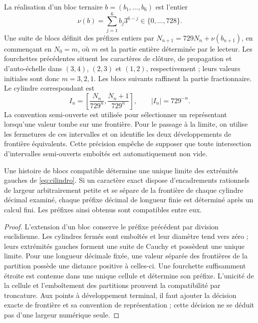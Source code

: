 La réalisation d'un bloc ternaire \(b=(b_1,\ldots,b_6)\) est l'entier
\[
 \nu(b)=\sum_{j=1}^6b_j3^{6-j}\in\{0,\ldots,728\}.
\]
Une suite de blocs définit des préfixes entiers par \(N_{n+1}=729N_n+\nu(b_{n+1})\), en commençant en \(N_0=m\), où \(m\) est la partie entière déterminée par le lecteur. Les fourchettes précédentes situent les caractères de clôture, de propagation et d'auto-échelle dans \((3,4)\), \((2,3)\) et \((1,2)\), respectivement ; leurs valeurs initiales sont donc \(m=3,2,1\). Les blocs suivants raffinent la partie fractionnaire. Le cylindre correspondant est
\begin{equation}
 I_n=\left[\frac{N_n}{729^n},\frac{N_n+1}{729^n}\right],
 \qquad |I_n|=729^{-n}.
 \label{eq:cilindro}
\end{equation}
La convention semi-ouverte est utilisée pour sélectionner un représentant lorsqu'une valeur tombe sur une frontière. Pour le passage à la limite, on utilise les fermetures de ces intervalles et on identifie les deux développements de frontière équivalents. Cette précision empêche de supposer que toute intersection d'intervalles semi-ouverts emboîtés est automatiquement non vide.

\begin{theorem}
Une histoire de blocs compatible détermine une unique limite des extrémités gauches de \eqref{eq:cilindro}. Si un caractère exact dispose d'encadrements rationnels de largeur arbitrairement petite et se sépare de la frontière de chaque cylindre décimal examiné, chaque préfixe décimal de longueur finie est déterminé après un calcul fini. Les préfixes ainsi obtenus sont compatibles entre eux.
\end{theorem}
\begin{proof}
L'extension d'un bloc conserve le préfixe précédent par division euclidienne. Les cylindres fermés sont emboîtés et leur diamètre tend vers zéro ; leurs extrémités gauches forment une suite de Cauchy et possèdent une unique limite. Pour une longueur décimale fixée, une valeur séparée des frontières de la partition possède une distance positive à celles-ci. Une fourchette suffisamment étroite est contenue dans une unique cellule et détermine son préfixe. L'unicité de la cellule et l'emboîtement des partitions prouvent la compatibilité par troncature. Aux points à développement terminal, il faut ajouter la décision exacte de frontière et sa convention de représentation ; cette décision ne se déduit pas d'une largeur numérique seule.
\end{proof}

